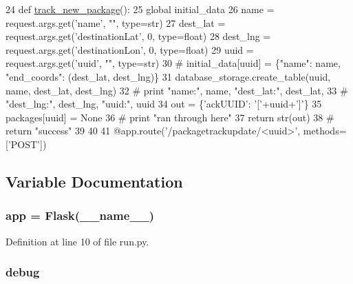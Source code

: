 \begin{DoxyCode}
24 \textcolor{keyword}{def }\hyperlink{namespacerun_aa2d7bc76e937566fe3f05617c102bba9}{track\_new\_package}():
25     \textcolor{keyword}{global} initial\_data
26     name = request.args.get(\textcolor{stringliteral}{'name'}, \textcolor{stringliteral}{""}, type=str)
27     dest\_lat = request.args.get(\textcolor{stringliteral}{'destinationLat'}, 0, type=float)
28     dest\_lng = request.args.get(\textcolor{stringliteral}{'destinationLon'}, 0, type=float)
29     uuid = request.args.get(\textcolor{stringliteral}{'uuid'}, \textcolor{stringliteral}{""}, type=str)
30     \textcolor{comment}{# initial\_data[uuid] = \{"name": name, "end\_coords": (dest\_lat, dest\_lng)\}}
31     database\_storage.create\_table(uuid, name, dest\_lat, dest\_lng)
32     \textcolor{comment}{# print "name:", name, "dest\_lat:", dest\_lat,}
33     \textcolor{comment}{#                       "dest\_lng:", dest\_lng, "uuid:", uuid}
34     out = \{\textcolor{stringliteral}{'ackUUID'}: \textcolor{stringliteral}{'['}+uuid+\textcolor{stringliteral}{']'}\}
35     packages[uuid] = \textcolor{keywordtype}{None}
36     \textcolor{comment}{# print "ran through here"}
37     \textcolor{keywordflow}{return} str(out)
38     \textcolor{comment}{# return "success"}
39 
40 
41 @app.route(\textcolor{stringliteral}{'/packagetrackupdate/<uuid>'}, methods=[\textcolor{stringliteral}{'POST'}])
\end{DoxyCode}


\subsection{Variable Documentation}
\subsubsection[{\texorpdfstring{app}{app}}]{\setlength{\rightskip}{0pt plus 5cm}app = Flask(\+\_\+\+\_\+name\+\_\+\+\_\+)}\hypertarget{namespacerun_afe63fea7be31b0200b496d08bc6b517d}{}\label{namespacerun_afe63fea7be31b0200b496d08bc6b517d}


Definition at line 10 of file run.\+py.

\subsubsection[{\texorpdfstring{debug}{debug}}]{\setlength{\rightskip}{0pt plus 5cm}debug}\hypertarget{namespacerun_a0514aabed091ee5e2f35766eb01eced6}{}\label{namespacerun_a0514aabed091ee5e2f35766eb01eced6}


